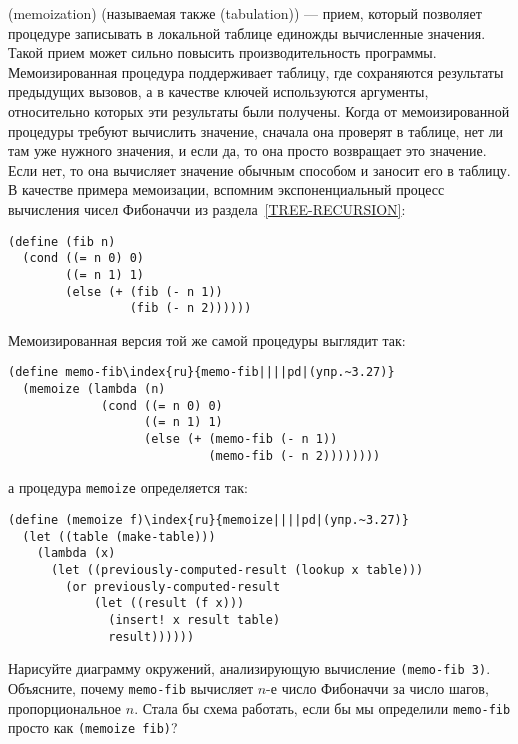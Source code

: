 \begin{exercise}{3.27}\label{EX3.27}%
%
 (memoization)
%
%
(называемая также %
 (tabulation)) ---
прием, который позволяет процедуре записывать в локальной таблице
единожды вычисленные значения.  Такой прием может сильно повысить
производительность программы.  Мемоизированная процедура поддерживает
таблицу, где сохраняются результаты предыдущих вызовов, а в
качестве ключей используются аргументы, относительно которых эти результаты
были получены.  Когда от мемоизированной процедуры требуют вычислить
значение, сначала она проверят в таблице, нет ли там уже нужного
значения, и если да, то она просто возвращает это значение.  Если нет,
то она вычисляет значение обычным способом и заносит его в таблицу.  В
качестве примера мемоизации, вспомним экспоненциальный процесс
вычисления чисел Фибоначчи из
раздела~\ref{TREE-RECURSION}:

\begin{Verbatim}[fontsize=\small]
(define (fib n)
  (cond ((= n 0) 0)
        ((= n 1) 1)
        (else (+ (fib (- n 1))
                 (fib (- n 2))))))
\end{Verbatim}
Мемоизированная версия той же самой процедуры выглядит так:

\begin{Verbatim}[fontsize=\small]
(define memo-fib\index{ru}{memo-fib||||pd|(упр.~3.27)}
  (memoize (lambda (n)
             (cond ((= n 0) 0)
                   ((= n 1) 1)
                   (else (+ (memo-fib (- n 1))
                            (memo-fib (- n 2))))))))
\end{Verbatim}
а процедура {\tt memoize} определяется так:

\begin{Verbatim}[fontsize=\small]
(define (memoize f)\index{ru}{memoize||||pd|(упр.~3.27)}
  (let ((table (make-table)))
    (lambda (x)
      (let ((previously-computed-result (lookup x table)))
        (or previously-computed-result
            (let ((result (f x)))
              (insert! x result table)
              result))))))
\end{Verbatim}
Нарисуйте диаграмму окружений, анализирующую вычисление
{\tt (memo-fib 3)}.  Объясните, почему {\tt memo-fib}
вычисляет $n$-е число Фибоначчи за число шагов,
пропорциональное $n$.  Стала бы схема работать, если бы мы
определили {\tt memo-fib} просто как {\tt (memoize fib)}?
\end{exercise}

